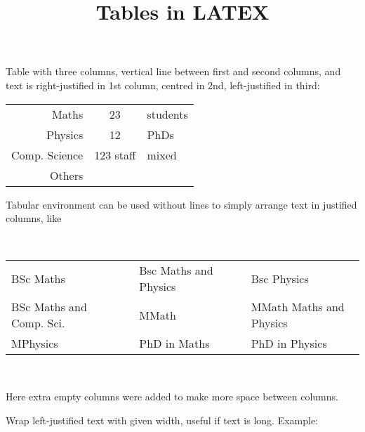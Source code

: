 \documentclass{article}
\begin{document}
\title{Tables in LATEX}
\date{}
\maketitle

Table with three columns, vertical line between first and second columns, and text is right-justified in 1st column, centred in 2nd, left-justified in third:



\begin{tabular}{|r|cl|}
\hline
Maths& 23& students\\
Physics&12&PhDs\\
Comp. Science&123 staff& mixed\\
\hline\hline
Others&& \\
\hline
\end{tabular}



Tabular environment can be used without lines to simply arrange text in justified columns, like

\

\begin{tabular}{l c l c l}

BSc Maths& &Bsc Maths and Physics && Bsc Physics\\
BSc Maths and Comp. Sci. & &MMath &&MMath Maths and Physics\\
MPhysics &&PhD in Maths&& PhD in Physics
\end{tabular}

\

Here extra empty columns were added to make more space between columns.


Wrap left-justified text with given width, useful if text is long. Example:
\end{document}
